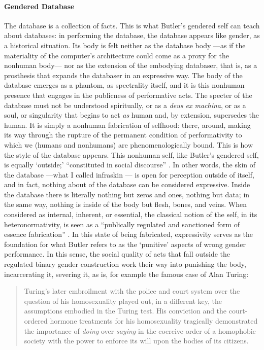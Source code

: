 \paragraph{Gendered Database}
The database is a collection of facts. This is what Butler's gendered self can teach about databases: in performing the database, the database appears like gender, as a historical situation. Its body is felt neither as the database body ---as if the materiality of the computer's architecture could come as a proxy for the nonhuman body--- nor as the extension of the embodying databaser, that is, as a prosthesis that expands the databaser in an expressive way. The body of the database emerges as a phantom, as spectrality itself, and it is this nonhuman presence that engages in the publicness of performative acts. The specter of the database must not be understood spiritually, or as a \textit{deus ex machina}, or as a soul, or singularity that begins to act \textit{as} human and, by extension, supersedes the human. It is simply a nonhuman fabrication of selfhood: there, around, making its way through the rupture of the permanent condition of performativity to which we (humans and nonhumans) are phenomenologically bound. This is how the style of the database appears. This nonhuman self, like Butler's gendered self, is equally `outside;' ``constituted in social discourse'' \parencite[528]{But88:Per}. In other words, the skin of the database ---what I called infraskin --- is open for perception outside of itself, and in fact, nothing about of the database can be considered expressive. Inside the database there is literally nothing but zeros and ones, nothing but data; in the same way, nothing is inside of the body but flesh, bones, and veins. When considered as internal, inherent, or essential, the classical notion of the self, in its heteronormativity, is seen as a ``publically regulated and sanctioned form of essence fabrication'' \parencite[528]{But88:Per}. In this state of being fabricated, expressivity serves as the foundation for what Butler refers to as the `punitive' aspects of wrong gender performance. In this sense, the social quality of acts that fall outside the regulated binary gender construction work their way into punishing the body, incarcerating it, severing it, as is, for example the famous case of Alan Turing:

\begin{quote}
	Turing's later embroilment with the police and court system over the question of his homosexuality played out, in a different key, the assumptions embodied in the Turing test. His conviction and the court-ordered hormone treatments for his homosexuality tragically demonstrated the importance of \textit{doing} over \textit{saying} in the coercive order of a homophobic society with the power to enforce its will upon the bodies of its citizens. \parencite[xii]{Hay99:How}
\end{quote}




